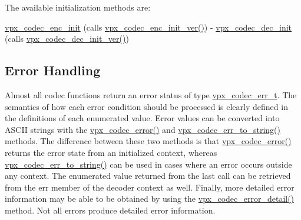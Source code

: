 The available initialization methods are\+:
\begin{DoxyItemize}
\item \hyperlink{group__encoder_ga3d490a2a9a6acd7c9ef82a603155f3cf}{vpx\+\_\+codec\+\_\+enc\+\_\+init} (calls \hyperlink{group__encoder_ga6ed21b96c481c0b6e1b543ef958a57a4}{vpx\+\_\+codec\+\_\+enc\+\_\+init\+\_\+ver()}) -\/ \hyperlink{group__decoder_ga8c2f0b12f1bd4927eb3c68b01eab19d3}{vpx\+\_\+codec\+\_\+dec\+\_\+init} (calls \hyperlink{group__decoder_ga26fe82cf8fd697f885935cea53be964f}{vpx\+\_\+codec\+\_\+dec\+\_\+init\+\_\+ver()})
\end{DoxyItemize}\hypertarget{usage_usage_errors}{}\subsection{Error Handling}\label{usage_usage_errors}
Almost all codec functions return an error status of type \hyperlink{group__codec_gada1084710837ad363b92f2379dd2b8d2}{vpx\+\_\+codec\+\_\+err\+\_\+t}. The semantics of how each error condition should be processed is clearly defined in the definitions of each enumerated value. Error values can be converted into A\+S\+C\+I\+I strings with the \hyperlink{group__codec_ga4d265df00d42b36a4f0e3eb83fc22c5e}{vpx\+\_\+codec\+\_\+error()} and \hyperlink{group__codec_gaaddf5c1f609ef18c7c8800d102fcefa6}{vpx\+\_\+codec\+\_\+err\+\_\+to\+\_\+string()} methods. The difference between these two methods is that \hyperlink{group__codec_ga4d265df00d42b36a4f0e3eb83fc22c5e}{vpx\+\_\+codec\+\_\+error()} returns the error state from an initialized context, whereas \hyperlink{group__codec_gaaddf5c1f609ef18c7c8800d102fcefa6}{vpx\+\_\+codec\+\_\+err\+\_\+to\+\_\+string()} can be used in cases where an error occurs outside any context. The enumerated value returned from the last call can be retrieved from the {\ttfamily err} member of the decoder context as well. Finally, more detailed error information may be able to be obtained by using the \hyperlink{group__codec_ga29273cb552ed1a437fe263c4a0a54300}{vpx\+\_\+codec\+\_\+error\+\_\+detail()} method. Not all errors produce detailed error information.

